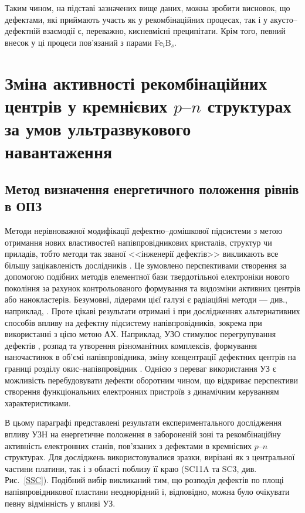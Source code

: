 Таким чином, на підставі зазначених вище даних, можна зробити висновок,
що дефектами, які приймають участь як у рекомбінаційних процесах, так і у акусто--дефектній взаємодії є, переважно,
кисневмісні преципітати.
Крім того, певний внесок у ці процеси пов'язаний з парами Fe$_i$B$_s$.

\section{Зміна активності рекомбінаційних центрів у кремнієвих $p$--$n$ структурах за умов ультразвукового навантаження\label{sBulyrMethod}}

\subsection{Метод визначення енергетичного положення рівнів в ОПЗ}

Методи нерівноважної модифікації дефектно--домішкової підсистеми з метою отримання нових властивостей напівпровідникових
кристалів, структур чи приладів, тобто методи так званої <<інженерії дефектів>> викликають все більшу зацікавленість дослідників \cite{Smirnov}.
Це зумовлено перспективами  створення за допомогою подібних методів елементної бази твердотільної
електроніки нового покоління за рахунок контрольованого формування та видозміни активних центрів або нанокластерів.
Безумовні, лідерами цієї галузі є радіаційні методи --- див., наприклад, \cite{Kozlovs,DefImplan}.
Проте цікаві результати отримані і при дослідженнях альтернативних способів впливу на дефектну підсистему напівпровідників,
зокрема при використанні з цією метою АХ.
Наприклад, УЗО стимулює перегрупування дефектів \cite{ZobovFTP2008}, розпад \cite{PodolHivr} та утворення \cite{YOlikh2006TPLr} різноманітних комплексів,
формування наночастинок \cite{Roman:2006JAP} в об'ємі напівпровідника,
зміну концентрації дефектних центрів на границі розділу окис--напівпровідник \cite{Parchinskii2006r}.
Однією з переваг використання УЗ є можливість перебудовувати дефекти оборотним чином, що відкриває
перспективи створення функціональних електронних пристроїв з динамічним керуванням характеристиками.

В цьому параграфі представлені результати експериментального дослідження впливу УЗН на енергетичне положення в забороненій зоні та
рекомбінаційну активність електронних станів, пов'язаних з дефектами в кремнієвих $p$--$n$ структурах.
Для досліджень використовувалися зразки, вирізані як з центральної частини платини, так і з області поблизу її краю (SC11A та SC3, див. Рис.~\ref{SSC}).
Подібний вибір викликаний тим, що розподіл дефектів по площі напівпровідникової пластини неоднорідний і, відповідно, можна було очікувати
певну відмінність у впливі УЗ.

